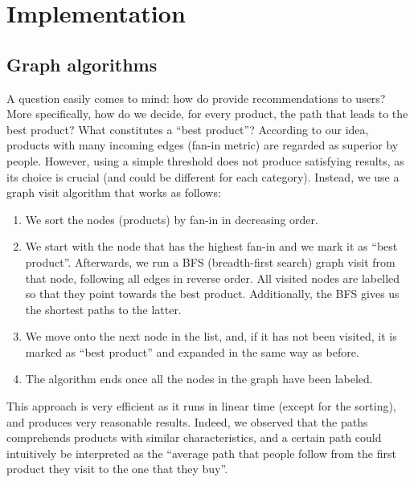 \documentclass[a4paper,12pt]{article}
\begin{document}
\section{Implementation}


\subsection{Graph algorithms}
A question easily comes to mind: how do provide recommendations to users? More specifically, how do we decide, for every product, the path that leads to the best product? What constitutes a ``best product''?
According to our idea, products with many incoming edges (fan-in metric) are regarded as superior by people. However, using a simple threshold does not produce satisfying results, as its choice is crucial (and could be different for each category). Instead, we use a graph visit algorithm that works as follows:
\begin{enumerate}
	\item We sort the nodes (products) by fan-in in decreasing order.
	\item We start with the node that has the highest fan-in and we mark it as ``best product''. Afterwards, we run a BFS (breadth-first search) graph visit from that node, following all edges in reverse order. All visited nodes are labelled so that they point towards the best product. Additionally, the BFS gives us the shortest paths to the latter.
	\item We move onto the next node in the list, and, if it has not been visited, it is marked as ``best product'' and expanded in the same way as before.
	\item The algorithm ends once all the nodes in the graph have been labeled.
\end{enumerate}

This approach is very efficient as it runs in linear time (except for the sorting), and produces very reasonable results. Indeed, we observed that the paths comprehends products with similar characteristics, and a certain path could intuitively be interpreted as the ``average path that people follow from the first product they visit to the one that they buy''.
\end{document}

